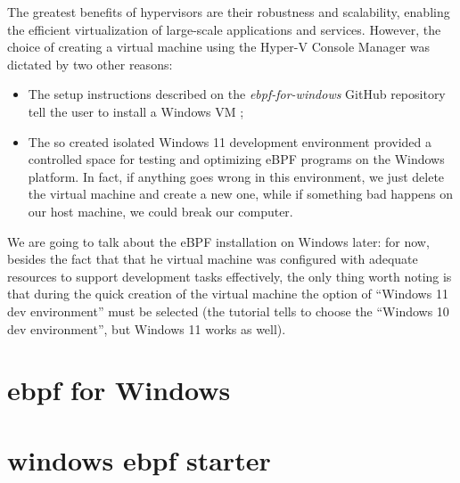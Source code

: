 The greatest benefits of hypervisors are their robustness and scalability, enabling the efficient virtualization of large-scale applications and services.
However, the choice of creating a virtual machine using the Hyper-V Console Manager was dictated by two other reasons:

\begin{itemize}
	\item 
		The setup instructions described on the \textit{ebpf-for-windows} GitHub repository tell the user to install a Windows VM \cite{VMSetup};
	\item 
		The so created isolated Windows 11 development environment provided a controlled space for testing and optimizing eBPF programs on the Windows platform.
		In fact, if anything goes wrong in this environment, we just delete the virtual machine and create a new one, while if something bad happens on our host machine, we could break our computer.
\end{itemize}

We are going to talk about the eBPF installation on Windows later: for now, besides the fact that that he virtual machine was configured with adequate resources to support development tasks effectively, the only thing worth noting is that during the quick creation of the virtual machine the option of ``Windows 11 dev environment'' must be selected (the tutorial tells to choose the ``Windows 10 dev environment'', but Windows 11 works as well).  


\section{ebpf for Windows}



\section{windows ebpf starter}

